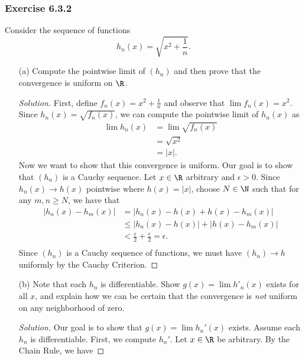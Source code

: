 \begin{enumerate}
\end{enumerate}

\subsubsection{Exercise 6.3.2} Consider the sequence of functions 
\[  h_n(x) = \sqrt{ x^2 + \frac{ 1 }{ n }  }. \]
\begin{enumerate}
    \item[(a)] Compute the pointwise limit of \( (h_n)  \) and then prove that the convergence is uniform on \( \R  \). 
        \begin{proof}[Solution]
        First, define \( f_n(x) = x^2 + \frac{ 1 }{ n }  \) and observe that \( \lim f_n(x) = x^2 \). Since \( h_n(x) = \sqrt{ f_n(x)  }  \), we can compute the pointwise limit of \( h_n(x)  \) as 
        \begin{align*}
            \lim h_n(x) &= \lim \sqrt{ f_n(x)  }   \\
                        &= \sqrt{ x^2  } \\
                        &= | x  |.
        \end{align*}
        Now we want to show that this convergence is uniform. Our goal is to show that \( (h_n)  \) is a Cauchy sequence. Let \( x \in \R  \) arbitrary and \( \epsilon > 0  \). Since \( h_n(x) \to h(x)  \) pointwise where \( h(x) = | x  |    \), choose \( N \in \N  \) such that for any \( m,n \geq N  \), we have that 
        \begin{align*}
            | h_n(x) - h_m(x) | &= | h_n(x) - h(x) + h(x) - h_m(x) |  \\
                                &\leq | h_n(x) - h(x)  | + | h(x) - h_m(x) | \\
                                &< \frac{ \epsilon  }{ 2 } + \frac{ \epsilon  }{ 2 } = \epsilon. \\
        \end{align*}
        Since \( (h_n)  \) is a Cauchy sequence of functions, we must have \( (h_n) \to h  \) uniformly by the Cauchy Criterion.
        \end{proof}
    \item[(b)] Note that each \( h_n  \) is differentiable. Show \( g(x) = \lim h'_n(x)  \) exists for all \( x  \), and explain how we can be certain that the convergence is \textit{not} uniform on any neighborhood of zero.
        \begin{proof}[Solution]
        Our goal is to show that \( g(x) = \lim h_n'(x)  \) exists. Assume each \( h_n  \) is differentiable. First, we compute \( h_n'  \). Let \( x \in \R  \) be arbitrary. By the Chain Rule, we have

\end{proof}
\end{enumerate}
